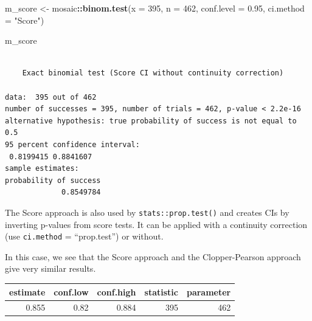 \documentclass[
]{book}
\newenvironment{Shaded}{\begin{snugshade}}{\end{snugshade}}
\newcommand{\DataTypeTok}[1]{\textcolor[rgb]{0.13,0.29,0.53}{#1}}
\newcommand{\DecValTok}[1]{\textcolor[rgb]{0.00,0.00,0.81}{#1}}
\newcommand{\FloatTok}[1]{\textcolor[rgb]{0.00,0.00,0.81}{#1}}
\newcommand{\KeywordTok}[1]{\textcolor[rgb]{0.13,0.29,0.53}{\textbf{#1}}}
\newcommand{\NormalTok}[1]{#1}
\newcommand{\OperatorTok}[1]{\textcolor[rgb]{0.81,0.36,0.00}{\textbf{#1}}}
\newcommand{\StringTok}[1]{\textcolor[rgb]{0.31,0.60,0.02}{#1}}
\begin{document}
\begin{Shaded}
\begin{Highlighting}[]
\NormalTok{m_score <-}\StringTok{ }\NormalTok{mosaic}\OperatorTok{::}\KeywordTok{binom.test}\NormalTok{(}\DataTypeTok{x =} \DecValTok{395}\NormalTok{, }\DataTypeTok{n =} \DecValTok{462}\NormalTok{,}
                              \DataTypeTok{conf.level =} \FloatTok{0.95}\NormalTok{,}
                              \DataTypeTok{ci.method =} \StringTok{"Score"}\NormalTok{)}

\NormalTok{m_score}
\end{Highlighting}
\end{Shaded}

\begin{verbatim}

	Exact binomial test (Score CI without continuity correction)

data:  395 out of 462
number of successes = 395, number of trials = 462, p-value < 2.2e-16
alternative hypothesis: true probability of success is not equal to 0.5
95 percent confidence interval:
 0.8199415 0.8841607
sample estimates:
probability of success 
             0.8549784 
\end{verbatim}

The Score approach is also used by \texttt{stats::prop.test()} and creates CIs by inverting p-values from score tests. It can be applied with a continuity correction (use \texttt{ci.method} = ``prop.test'') or without.

In this case, we see that the Score approach and the Clopper-Pearson approach give very similar results.

\begin{Shaded}
\end{Shaded}

\begin{tabular}{r|r|r|r|r}
\hline
estimate & conf.low & conf.high & statistic & parameter\\
\hline
0.855 & 0.82 & 0.884 & 395 & 462\\
\hline
\end{tabular}
\end{document}
